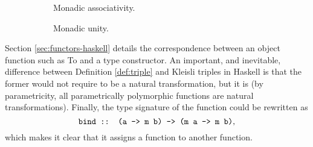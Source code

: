 \begin{figure}[htb]
  \begin{center}
    \begin{subfigure}[b]{0.45\linewidth}
      \begin{center}
      \end{center}
      \caption{Monadic associativity.}
      \label{fig:triple-associativity-haskell}
    \end{subfigure}
    \begin{subfigure}[b]{0.45\linewidth}
      \begin{center}
      \end{center}
      \caption{Monadic unity.}
      \label{fig:triple-unity-haskell}
    \end{subfigure}
  \end{center}
  \caption{}
\end{figure}

Section \ref{sec:functors-haskell} details the correspondence between
an object function such as To and a type constructor.
An important, and inevitable, difference between Definition
\ref{def:triple} and Kleisli triples in Haskell is that the former would not
require  to be a natural transformation, but it is
(by parametricity, all parametrically polymorphic functions are
natural transformations). Finally, the type signature of the
 function could be rewritten as
\begin{equation*}
  \text{\texttt{bind :: (a -> m b) -> (m a -> m b)}}
  \text{,}
\end{equation*}
which makes it clear that it assigns a function to another function.

